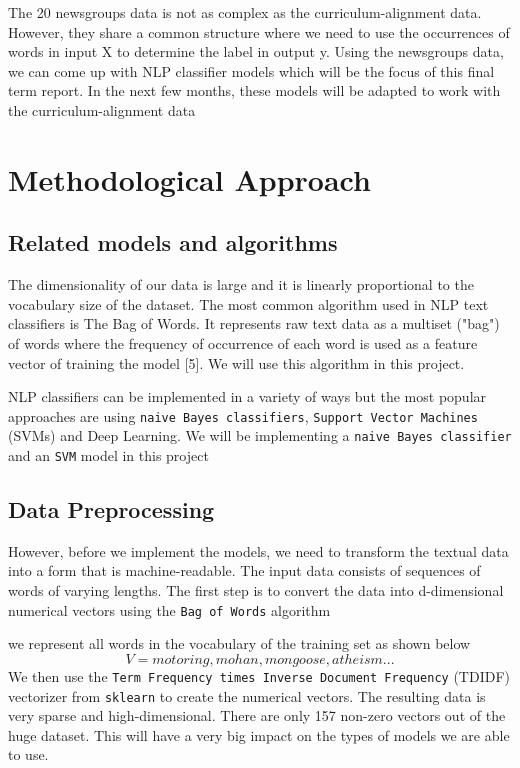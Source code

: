 \documentclass{article}
\begin{document}
The 20 newsgroups data is not as complex as the curriculum-alignment data. However, they share a common structure where we need to use the occurrences of words in input X to determine the label in output y. Using the newsgroups data, we can come up with NLP classifier models which will be the focus of this final term report. In the next few months, these models will be adapted to work with the curriculum-alignment data

\section{Methodological Approach}

\subsection{Related models and algorithms}

The dimensionality of our data is large and it is linearly proportional to the vocabulary size of the dataset. The most common algorithm used in NLP text classifiers is The Bag of Words. It represents raw text data as a multiset ("bag") of words where the frequency of occurrence of each word is used as a feature vector of training the model [5]. We will use this algorithm in this project.

NLP classifiers can be implemented in a variety of ways but the most popular approaches are using \texttt{naive Bayes classifiers}, \texttt{Support Vector Machines} (SVMs) and Deep Learning. We will be implementing a \texttt{naive Bayes classifier} and an \texttt{SVM} model in this project

\subsection{Data Preprocessing}

However, before we implement the models, we need to transform the textual data into a form that is machine-readable. The input data consists of sequences of words of varying lengths. The first step is to convert the data into d-dimensional numerical vectors using the \texttt{Bag of Words} algorithm 

 we represent all words in the vocabulary of the training set as shown below
\begin{equation}
V = {motoring, mohan,mongoose,atheism ...}
\end{equation}
We then use the \texttt{Term Frequency times Inverse Document Frequency} (TDIDF) vectorizer from \texttt{sklearn} to create the numerical vectors. The resulting data is very sparse and high-dimensional. There are only 157 non-zero vectors out of the huge dataset. This will have a very big impact on the types of models we are able to use. 
\end{document}
